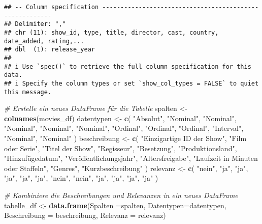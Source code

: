 \documentclass[
]{article}
\newenvironment{Shaded}{\begin{snugshade}}{\end{snugshade}}
\newcommand{\AttributeTok}[1]{\textcolor[rgb]{0.13,0.29,0.53}{#1}}
\newcommand{\CommentTok}[1]{\textcolor[rgb]{0.56,0.35,0.01}{\textit{#1}}}
\newcommand{\FunctionTok}[1]{\textcolor[rgb]{0.13,0.29,0.53}{\textbf{#1}}}
\newcommand{\NormalTok}[1]{#1}
\newcommand{\OtherTok}[1]{\textcolor[rgb]{0.56,0.35,0.01}{#1}}
\newcommand{\StringTok}[1]{\textcolor[rgb]{0.31,0.60,0.02}{#1}}
\begin{document}
\begin{verbatim}
## -- Column specification --------------------------------------------------------
## Delimiter: ","
## chr (11): show_id, type, title, director, cast, country, date_added, rating,...
## dbl  (1): release_year
## 
## i Use `spec()` to retrieve the full column specification for this data.
## i Specify the column types or set `show_col_types = FALSE` to quiet this message.
\end{verbatim}

\begin{Shaded}
\begin{Highlighting}[]
\CommentTok{\# Erstelle ein neues DataFrame für die Tabelle}
\NormalTok{spalten }\OtherTok{\textless{}{-}} \FunctionTok{colnames}\NormalTok{(movies\_df)}
\NormalTok{datentypen }\OtherTok{\textless{}{-}} \FunctionTok{c}\NormalTok{(}
  \StringTok{"Absolut"}\NormalTok{,}
  \StringTok{"Nominal"}\NormalTok{,}
  \StringTok{"Nominal"}\NormalTok{,}
  \StringTok{"Nominal"}\NormalTok{,}
  \StringTok{"Nominal"}\NormalTok{,}
  \StringTok{"Nominal"}\NormalTok{,}
  \StringTok{"Ordinal"}\NormalTok{,}
  \StringTok{"Ordinal"}\NormalTok{,}
  \StringTok{"Ordinal"}\NormalTok{,}
  \StringTok{"Interval"}\NormalTok{,}
  \StringTok{"Nominal"}\NormalTok{,}
  \StringTok{"Nominal"}
\NormalTok{)}
\NormalTok{beschreibung }\OtherTok{\textless{}{-}} \FunctionTok{c}\NormalTok{(}
    \StringTok{"Einzigartige ID der Show"}\NormalTok{, }
    \StringTok{"Film oder Serie"}\NormalTok{, }
    \StringTok{"Titel der Show"}\NormalTok{, }
    \StringTok{"Regisseur"}\NormalTok{, }
    \StringTok{"Besetzung"}\NormalTok{,}
    \StringTok{"Produktionsland"}\NormalTok{,}
    \StringTok{"Hinzufügedatum"}\NormalTok{,}
    \StringTok{"Veröffentlichungsjahr"}\NormalTok{,}
    \StringTok{"Altersfreigabe"}\NormalTok{,}
    \StringTok{"Laufzeit in Minuten oder Staffeln"}\NormalTok{,}
    \StringTok{"Genres"}\NormalTok{,}
    \StringTok{"Kurzbeschreibung"}
\NormalTok{)}
\NormalTok{relevanz }\OtherTok{\textless{}{-}} \FunctionTok{c}\NormalTok{(}
    \StringTok{"nein"}\NormalTok{,}
    \StringTok{"ja"}\NormalTok{,}
    \StringTok{"ja"}\NormalTok{,}
    \StringTok{"ja"}\NormalTok{,}
    \StringTok{"ja"}\NormalTok{,}
    \StringTok{"ja"}\NormalTok{,}
    \StringTok{"nein"}\NormalTok{,}
    \StringTok{"nein"}\NormalTok{,}
    \StringTok{"ja"}\NormalTok{,}
    \StringTok{"ja"}\NormalTok{,}
    \StringTok{"ja"}\NormalTok{,}
    \StringTok{"ja"}
\NormalTok{)}

\CommentTok{\# Kombiniere die Beschreibungen und Relevanzen in ein neues DataFrame}
\NormalTok{tabelle\_df }\OtherTok{\textless{}{-}} \FunctionTok{data.frame}\NormalTok{(}\AttributeTok{Spalten =}\NormalTok{spalten, }\AttributeTok{Datentypen=}\NormalTok{datentypen,  }\AttributeTok{Beschreibung =}\NormalTok{ beschreibung, }\AttributeTok{Relevanz =}\NormalTok{ relevanz)}


\end{Highlighting}
\end{Shaded}
\end{document}
